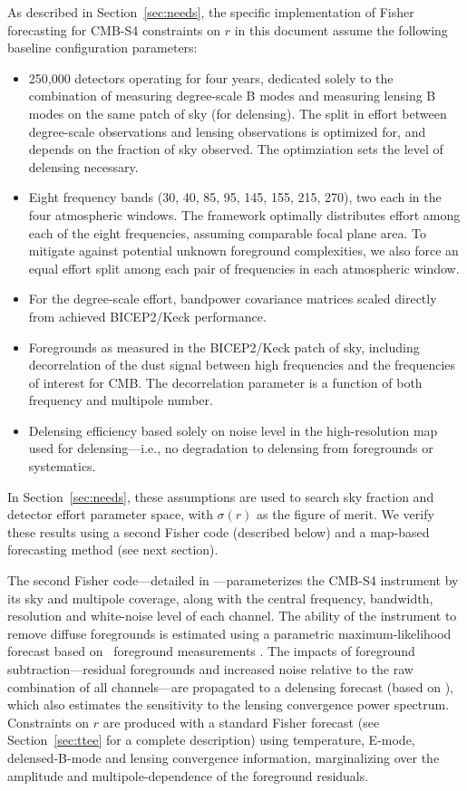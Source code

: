 As described in Section~\ref{sec:needs}, the specific implementation of Fisher forecasting for CMB-S4 constraints on $r$ in this document assume the following baseline configuration parameters:
%
\begin{itemize}
\item{250,000 detectors operating for four years, dedicated solely to the combination of measuring degree-scale B modes and measuring lensing B modes on the same patch of sky (for delensing). 
The split in effort between degree-scale observations and lensing observations is
optimized for, and depends on the fraction of sky observed. The optimziation sets the level of delensing necessary.}
\item{Eight frequency bands (30, 40, 85, 95, 145, 155, 215, 270), two each in the four atmospheric windows. The framework optimally distributes effort among each of the 
eight frequencies, assuming comparable focal plane area. To mitigate against 
potential unknown foreground complexities, we also force an equal effort 
split among each pair of frequencies in each atmospheric window.}
\item{For the degree-scale effort, bandpower covariance matrices scaled directly from achieved BICEP2/Keck performance.}
\item{Foregrounds as measured in the BICEP2/Keck patch of sky, including decorrelation of the dust signal between high frequencies and the frequencies of interest for CMB. The decorrelation parameter is a function of both frequency and multipole number.}
\item{Delensing efficiency based solely on noise level in the high-resolution map used for delensing---i.e., no degradation to delensing from foregrounds or systematics.}
\end{itemize}
%
In Section~\ref{sec:needs}, these assumptions are used to search sky fraction and detector effort parameter space, with 
$\sigma(r)$ as the figure of merit. We verify these results using a second Fisher code (described below) and a map-based
forecasting method (see next section).

The second Fisher code---detailed in \cite{Errard:2015cxa}---parameterizes the CMB-S4 instrument by its sky and multipole coverage, along with the central frequency, bandwidth, resolution and white-noise level of each channel. The ability of the instrument to remove diffuse foregrounds is estimated using a parametric maximum-likelihood forecast \cite{Errard:2011vi,Errard:2012qx} based on \planck\ foreground measurements \cite{Adam:2015tpy,Adam:2015wua}. The impacts of foreground subtraction---residual foregrounds and increased noise relative to the raw combination of all channels---are propagated to a delensing forecast (based on \cite{Smith:2010gu}), which also estimates the sensitivity to the lensing convergence power spectrum. Constraints on $r$ are produced with a standard Fisher forecast (see Section~\ref{sec:ttee} for a complete description) using temperature, E-mode, delensed-B-mode and lensing convergence information, marginalizing over the amplitude and multipole-dependence of the foreground residuals. 

